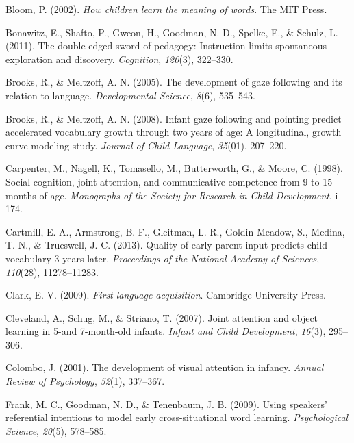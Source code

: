 \documentclass[authoryear, review]{elsarticle}
\begin{document}
\hypertarget{ref-bloom2002children}{}
Bloom, P. (2002). \emph{How children learn the meaning of words}. The
MIT Press.

\hypertarget{ref-bonawitz2011double}{}
Bonawitz, E., Shafto, P., Gweon, H., Goodman, N. D., Spelke, E., \&
Schulz, L. (2011). The double-edged sword of pedagogy: Instruction
limits spontaneous exploration and discovery. \emph{Cognition},
\emph{120}(3), 322--330.

\hypertarget{ref-brooks2005development}{}
Brooks, R., \& Meltzoff, A. N. (2005). The development of gaze following
and its relation to language. \emph{Developmental Science}, \emph{8}(6),
535--543.

\hypertarget{ref-brooks2008infant}{}
Brooks, R., \& Meltzoff, A. N. (2008). Infant gaze following and
pointing predict accelerated vocabulary growth through two years of age:
A longitudinal, growth curve modeling study. \emph{Journal of Child
Language}, \emph{35}(01), 207--220.

\hypertarget{ref-carpenter1998social}{}
Carpenter, M., Nagell, K., Tomasello, M., Butterworth, G., \& Moore, C.
(1998). Social cognition, joint attention, and communicative competence
from 9 to 15 months of age. \emph{Monographs of the Society for Research
in Child Development}, i--174.

\hypertarget{ref-cartmill2013quality}{}
Cartmill, E. A., Armstrong, B. F., Gleitman, L. R., Goldin-Meadow, S.,
Medina, T. N., \& Trueswell, J. C. (2013). Quality of early parent input
predicts child vocabulary 3 years later. \emph{Proceedings of the
National Academy of Sciences}, \emph{110}(28), 11278--11283.

\hypertarget{ref-clark2009first}{}
Clark, E. V. (2009). \emph{First language acquisition}. Cambridge
University Press.

\hypertarget{ref-cleveland2007joint}{}
Cleveland, A., Schug, M., \& Striano, T. (2007). Joint attention and
object learning in 5-and 7-month-old infants. \emph{Infant and Child
Development}, \emph{16}(3), 295--306.

\hypertarget{ref-colombo2001development}{}
Colombo, J. (2001). The development of visual attention in infancy.
\emph{Annual Review of Psychology}, \emph{52}(1), 337--367.

\hypertarget{ref-frank2009using}{}
Frank, M. C., Goodman, N. D., \& Tenenbaum, J. B. (2009). Using
speakers' referential intentions to model early cross-situational word
learning. \emph{Psychological Science}, \emph{20}(5), 578--585.
\end{document}

